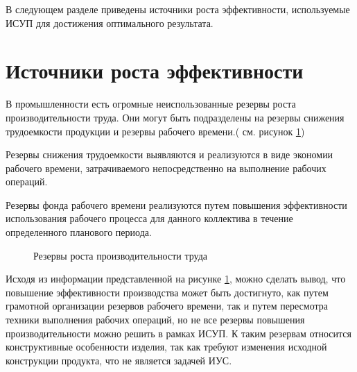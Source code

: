 В следующем разделе приведены источники роста эффективности, используемые ИСУП для достижения оптимального результата. 

\section{Источники роста эффективности}

В промышленности есть огромные неиспользованные резервы роста производительности труда. Они могут быть подразделены на резервы снижения трудоемкости продукции и резервы рабочего времени.( см. рисунок \ref{ris:reserve1})

Резервы снижения трудоемкости выявляются и реализуются в виде экономии рабочего времени, затрачиваемого непосредственно на выполнение рабочих операций.

Резервы фонда рабочего времени реализуются путем повышения эффективности использования рабочего процесса для данного коллектива в течение определенного планового периода\cite{Lenin}. 


\begin{figure}[H]
    \caption{Резервы роста производительности труда}
    \label{ris:reserve1}
\end{figure}

Исходя из информации представленной на рисунке \ref{ris:reserve1}, можно сделать вывод, что повышение эффективности производства может быть достигнуто, как путем грамотной организации резервов рабочего времени, так и путем пересмотра техники выполнения рабочих операций, но не все резервы повышения производительности можно решить в рамках ИСУП. К таким резервам относится конструктивные особенности изделия, так как требуют изменения исходной конструкции продукта, что не является задачей ИУС.


